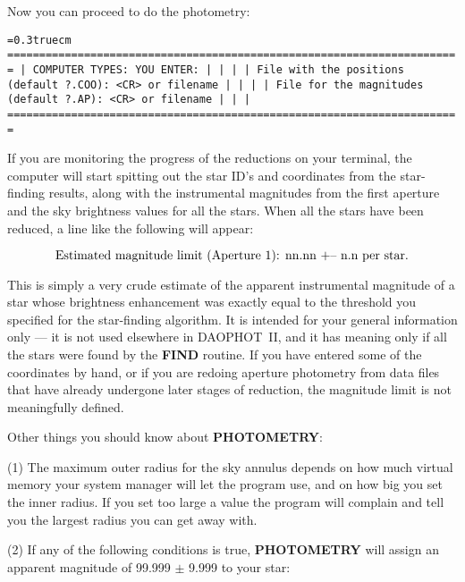 \vfill
\eject

Now you can proceed to do the photometry: 

\bigskip
{\noindent\obeylines\obeyspaces\frenchspacing\tt\baselineskip=0.3truecm
=======================================================================
| COMPUTER TYPES:                                  YOU ENTER:         |
|                                                                     |
|    File with the positions (default ?.COO):      <CR> or filename   |
|                                                                     |
|     File for the magnitudes (default ?.AP):      <CR> or filename   |
|                                                                     |
=======================================================================
}
\bigskip

\noindent If you are monitoring the progress of the reductions on your
terminal, the computer will start spitting out the star ID's and
coordinates from the star-finding results, along with the instrumental
magnitudes from the first aperture and the sky brightness values for
all the stars.  When all the stars have been reduced, a line like the
following will appear:

$$\hbox{\rm Estimated magnitude limit (Aperture 1):  nn.nn +-- n.n per star.}$$

\noindent This is simply a very crude estimate of the apparent
instrumental magnitude of a star whose brightness enhancement was
exactly equal to the threshold you specified for the star-finding
algorithm.  It is intended for your general information only --- it is
not used elsewhere in DAOPHOT~II, and it has meaning only if all the
stars were found by the {\bf FIND} routine.  If you have entered some
of the coordinates by hand, or if you are redoing aperture photometry
from data files that have already undergone later stages of reduction,
the magnitude limit is not meaningfully defined.

Other things you should know about {\bf PHOTOMETRY}:

\item{(1)} The maximum outer radius for the sky annulus depends on how
much virtual memory your system manager will let the program use, and
on how big you set the inner radius.  If you set too large a value the
program will complain and tell you the largest radius you can get away
with.

\item{(2)} If any of the following conditions is true, {\bf PHOTOMETRY}
will assign an apparent magnitude of 99.999 $\pm$ 9.999 to your star: 

